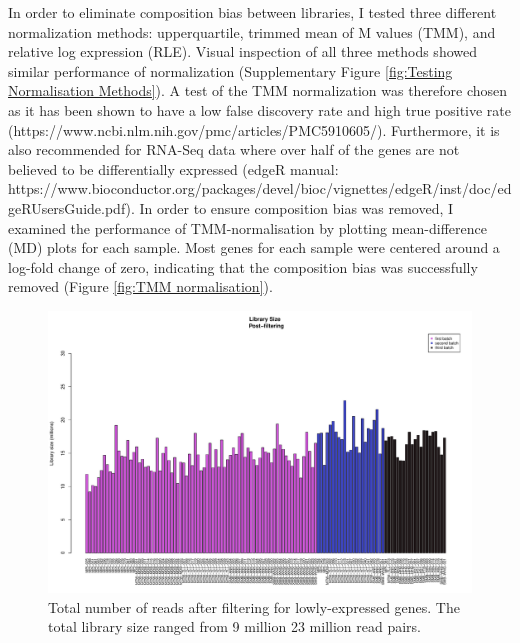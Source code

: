 \documentclass[12pt,a4paper,titlepage,twoside,openright]{book}
\begin{document}
\begin{mainmatter}
In order to eliminate composition bias between libraries, I tested three different normalization methods: upperquartile, trimmed mean of M values (TMM), and relative log expression (RLE). Visual inspection of all three methods showed similar performance of normalization (Supplementary Figure \ref{fig:Testing Normalisation Methods}). A test of the TMM normalization was therefore chosen as it has been shown to have a low false discovery rate and high true positive rate (https://www.ncbi.nlm.nih.gov/pmc/articles/PMC5910605/). Furthermore, it is also recommended for RNA-Seq data where over half of the genes are not believed to be differentially expressed (edgeR manual: https://www.bioconductor.org/packages/devel/bioc/vignettes/edgeR/inst/doc/edgeRUsersGuide.pdf). In order to ensure composition bias was removed, I examined the performance of TMM-normalisation by plotting mean-difference (MD) plots for each sample. Most genes for each sample were centered around a log-fold change of zero, indicating that the composition bias was successfully removed (﻿Figure \ref{fig:TMM normalisation}).

\begin{figure}[htb!]
\centering
\includegraphics[width=\textwidth,height=\textheight,keepaspectratio]{librarySize_indoRNA_postFiltering_123Combined.pdf}
\caption{Total number of reads after filtering for lowly-expressed genes. The total library size ranged from 9 million 23 million read pairs.}
\label{fig:library size}
\end{figure}
  


\end{mainmatter}
\end{document}
